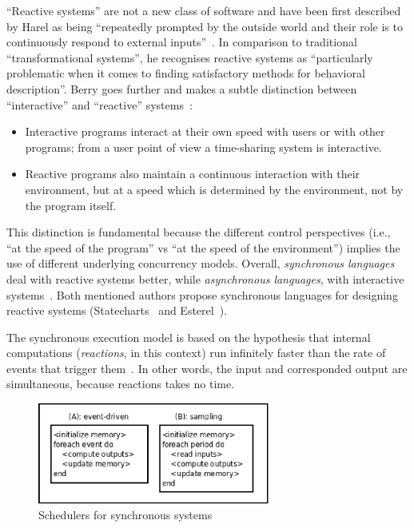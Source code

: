 \documentclass{acm_proc_article-sp}
\newcommand{\CEU}{\textsc{C\'{e}u}\xspace}
\newcommand{\1}{\;}
\newcommand{\2}{\;\;}
\newcommand{\3}{\;\;\;}
\newcommand{\5}{\;\;\;\;\;}
\begin{document}
``Reactive systems'' are not a new class of software and have been first 
described by Harel as being ``repeatedly prompted by the outside world and 
their role is to continuously respond to external 
inputs''~\cite{statecharts.reactive}.
In comparison to traditional ``transformational systems'', he recognises 
reactive systems as ``particularly problematic when it comes to finding 
satisfactory methods for behavioral description''.
%
Berry goes further and makes a subtle distinction between ``interactive'' and 
``reactive'' systems~\cite{rp.synchronous}:
%
\begin{itemize}
\item Interactive programs interact at their own speed with users or with other 
programs; from a user point of view a time-sharing system is interactive.
\item Reactive programs also maintain a continuous interaction with their 
environment, but at a speed which is determined by the environment, not by the 
program itself.
\end{itemize}


This distinction is fundamental because the different control perspectives 
(i.e., ``at the speed of the program'' vs ``at the speed of the environment'') 
implies the use of different underlying concurrency models.
%
Overall, \emph{synchronous languages} deal with reactive systems better, while 
\emph{asynchronous languages}, with interactive systems~\cite{esterel.crp}.
%
Both mentioned authors propose synchronous languages for designing reactive 
systems (Statecharts~\cite{statecharts.visual} and 
Esterel~\cite{esterel.ieee91}).


The synchronous execution model is based on the hypothesis that internal 
computations (\emph{reactions}, in this context) run infinitely faster than the 
rate of events that trigger them~\cite{rp.hypothesis}.
In other words, the input and corresponded output are simultaneous, because 
reactions takes no time.

\begin{figure}
\centering
\includegraphics[width=3.0in]{sync_impl.eps}
\caption{Schedulers for synchronous systems}
\label{fig.impl}
\end{figure}
\end{document}
